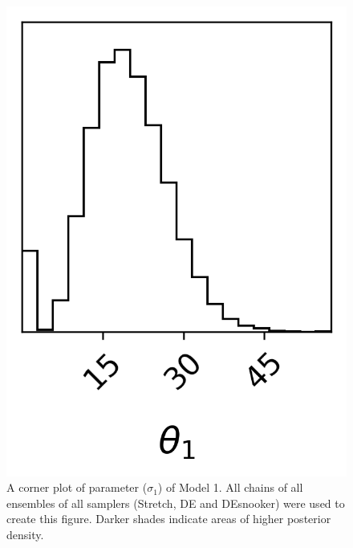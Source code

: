 \begin{figure}[ht]
\centering
\begin{minipage}[b]{0.45\textwidth}
    \centering
    \includegraphics[width=\textwidth]{Figures/appendix_figs/C1.4 corner plot Model 1.png}
    \caption{A corner plot of parameter ($\sigma_1$) of Model 1. All chains of all ensembles of all samplers (Stretch, DE and DEsnooker) were used to create this figure. Darker shades indicate areas of higher posterior density.}\label{fig_logbook_1.4_corner_model1}
\end{minipage}
\hfill
\begin{minipage}[b]{0.45\textwidth}
    \centering

\end{minipage}
\end{figure}
